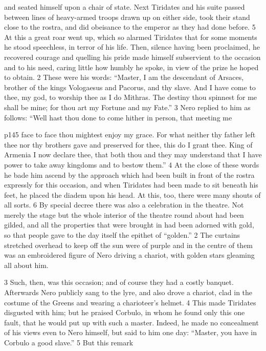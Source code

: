 and seated himself upon a chair of state. Next Tiridates and his suite passed between lines of heavy-armed troops drawn up on either side, took their stand close to the rostra, and did obeisance to the emperor as they had done before. 5 At this a great roar went up, which so alarmed Tiridates that for some moments he stood speechless, in terror of his life. Then, silence having been proclaimed, he recovered courage and quelling his pride made himself subservient to the occasion and to his need, caring little how humbly he spoke, in view of the prize he hoped to obtain. 2 These were his words: ``Master, I am the descendant of Arsaces, brother of the kings Vologaesus and Pacorus, and thy slave. And I have come to thee, my god, to worship thee as I do Mithras. The destiny thou spinnest for me shall be mine; for thou art my Fortune and my Fate.'' 3 Nero replied to him as follows: ``Well hast thou done to come hither in person, that meeting me

p145 face to face thou mightest enjoy my grace. For what neither thy father left thee nor thy brothers gave and preserved for thee, this do I grant thee. King of Armenia I now declare thee, that both thou and they may understand that I have power to take away kingdoms and to bestow them.'' 4 At the close of these words he bade him ascend by the approach which had been built in front of the rostra expressly for this occasion, and when Tiridates had been made to sit beneath his feet, he placed the diadem upon his head. At this, too, there were many shouts of all sorts. 6 By special decree there was also a celebration in the theatre. Not merely the stage but the whole interior of the theatre round about had been gilded, and all the properties that were brought in had been adorned with gold, so that people gave to the day itself the epithet of ``golden.'' 2 The curtains stretched overhead to keep off the sun were of purple and in the centre of them was an embroidered figure of Nero driving a chariot, with golden stars gleaming all about him.

3
Such, then, was this occasion; and of course they had a costly banquet. Afterwards Nero publicly sang to the lyre, and also drove a chariot, clad in the costume of the Greens and wearing a charioteer's helmet. 4 This made Tiridates disgusted with him; but he praised Corbulo, in whom he found only this one fault, that he would put up with such a master. Indeed, he made no concealment of his views even to Nero himself, but said to him one day: ``Master, you have in Corbulo a good slave.'' 5 But this remark

